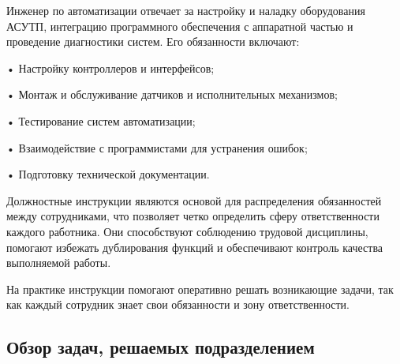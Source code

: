 {  \par \redline Инженер по автоматизации отвечает за настройку и наладку оборудования АСУТП, интеграцию программного обеспечения с аппаратной частью и проведение диагностики систем. Его обязанности включают:
  \par \redline • Настройку контроллеров и интерфейсов;
  \par \redline • Монтаж и обслуживание датчиков и исполнительных механизмов;
  \par \redline • Тестирование систем автоматизации;
  \par \redline • Взаимодействие с программистами для устранения ошибок;
  \par \redline • Подготовку технической документации.

  \par \redline Должностные инструкции являются основой для распределения обязанностей между сотрудниками, что позволяет четко определить сферу ответственности каждого работника. Они способствуют соблюдению трудовой дисциплины, помогают избежать дублирования функций и обеспечивают контроль качества выполняемой работы.

  \par \redline На практике инструкции помогают оперативно решать возникающие задачи, так как каждый сотрудник знает свои обязанности и зону ответственности. 

  \par 
}


\subtitlespace

\subsection*{  
  \gostTitleFont
   Обзор задач, решаемых подразделением
} 

\subtitlespace

